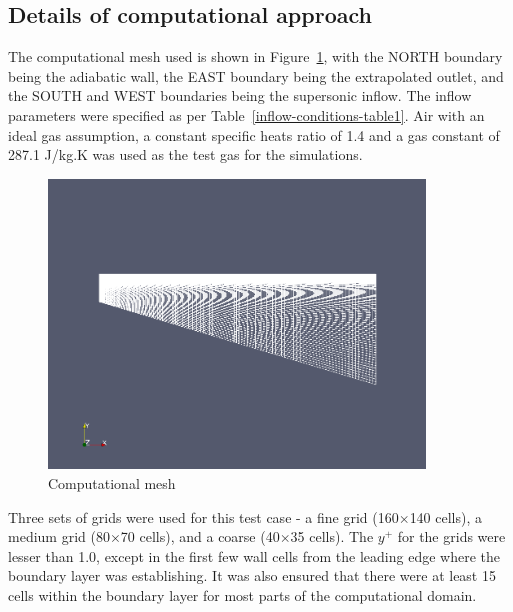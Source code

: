\subsection{Details of computational approach}
\label{flat-plate-computational-approach}
%
The computational mesh used is shown in Figure~\ref{computational-mesh},
with the NORTH boundary being the adiabatic wall, the EAST boundary being
the extrapolated outlet, and the SOUTH and WEST boundaries being the
supersonic inflow. The inflow parameters were specified as per
Table~\ref{inflow-conditions-table1}. Air with an ideal gas assumption, a
constant specific heats ratio of 1.4 and a gas constant of 287.1 J/kg.K was used
as the test gas for the simulations.
\begin{figure}[h]
 \begin{center}
  \includegraphics[width=10cm]{./chap2-flat-plate/figs/grid.png}
 \end{center}
 \caption{Computational mesh}
 \label{computational-mesh}
\end{figure}
Three sets of grids were used for this test case - a fine grid
(160$\times$140 cells), a medium grid (80$\times$70 cells), and a coarse (40$\times$35 cells).
The $y^+$ for the grids were lesser than 1.0, except in the first few wall
cells from the leading edge where the boundary layer was establishing.
It was also ensured that there were at least 15 cells within the
boundary layer for most parts of the computational domain.
